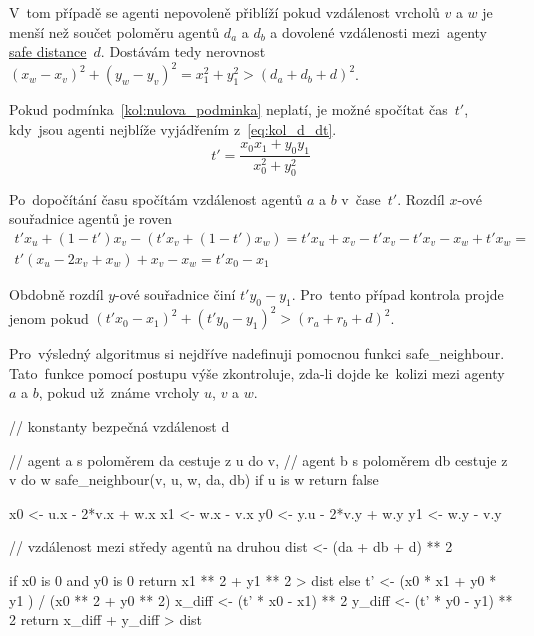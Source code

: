 V~tom případě se agenti nepovoleně přiblíží pokud vzdálenost vrcholů $v$ a $w$ je menší než
součet poloměru agentů $d_a$ a $d_b$ a dovolené vzdálenosti mezi~agenty \hyperref[par:safe_distance]{safe distance}~$d$.
Dostávám tedy nerovnost $(x_w - x_v)^2 + (y_w - y_v)^2 = x_1^2 + y_1^2 > (d_a + d_b + d)^2$.


Pokud podmínka~\ref{kol:nulova_podminka} neplatí, je možné spočítat čas~$t'$,
kdy~jsou agenti nejblíže vyjádřením z~\ref{eq:kol_d_dt}.
\begin{equation}
	\label{eq:kol_t}
	t' = \frac{x_0 x_1 + y_0 y_1}{x_0^2 + y_0^2}
\end{equation}

Po~dopočítání času spočítám vzdálenost agentů $a$ a $b$ v~čase~$t'$.
Rozdíl $x$-ové souřadnice agentů je roven
\begin{gather*}
	t' x_u + (1 - t')x_v - (t' x_v + (1 - t')x_w) =
	t' x_u + x_v - t' x_v - t' x_v - x_w + t' x_w = \\
	t'(x_u - 2x_v + x_w) + x_v - x_w =
	t' x_0 - x_1
\end{gather*}

Obdobně rozdíl $y$-ové souřadnice činí $t' y_0 - y_1$.
Pro~tento případ kontrola projde jenom pokud $(t' x_0 - x_1)^2 + (t' y_0 - y_1)^2 > (r_a + r_b + d)^2$.

Pro~výsledný algoritmus si nejdříve nadefinuji
pomocnou funkci \textrm{safe\_neighbour}.
Tato~funkce pomocí postupu výše zkontroluje, zda-li dojde ke~kolizi mezi agenty $a$ a $b$,
pokud už~známe vrcholy $u$, $v$ a $w$.

\begin{code}[fontsize=\footnotesize]
// konstanty bezpečná vzdálenost d

// agent a s poloměrem da cestuje z u do v,
// agent b s poloměrem db cestuje z v do w
safe_neighbour(v, u, w, da, db)
  if u is w
    return false

  x0 <- u.x - 2*v.x + w.x
  x1 <- w.x - v.x
  y0 <- y.u - 2*v.y + w.y
  y1 <- w.y - v.y

  // vzdálenost mezi středy agentů na druhou
  dist <- (da + db + d) ** 2

  if x0 is 0 and y0 is 0
    return x1 ** 2 + y1 ** 2 > dist
  else
    t' <- (x0 * x1 + y0 * y1 ) / (x0 ** 2 + y0 ** 2)
    x_diff <- (t' * x0 - x1) ** 2
    y_diff <- (t' * y0 - y1) ** 2
    return x_diff + y_diff > dist
\end{code}
\label{alg:check_neighbour}

